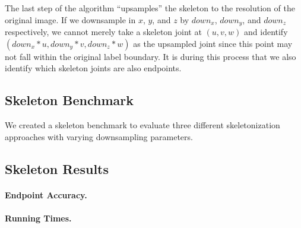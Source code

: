 The last step of the algorithm ``upsamples'' the skeleton to the resolution of the original image.
If we downsample in $x$, $y$, and $z$ by $down_x$, $down_y$, and $down_z$ respectively, we cannot merely take a skeleton joint at $(u, v, w)$ and identify $(down_x * u, down_y * v, down_z * w)$ as the upsampled joint since this point may not fall within the original label boundary.
It is during this process that we also identify which skeleton joints are also endpoints.


\subsection{Skeleton Benchmark}

We created a skeleton benchmark to evaluate three different skeletonization approaches with varying downsampling parameters.


\subsection{Skeleton Results}
\label{skeleton-results}

\paragraph{Endpoint Accuracy.}

\paragraph{Running Times.}




